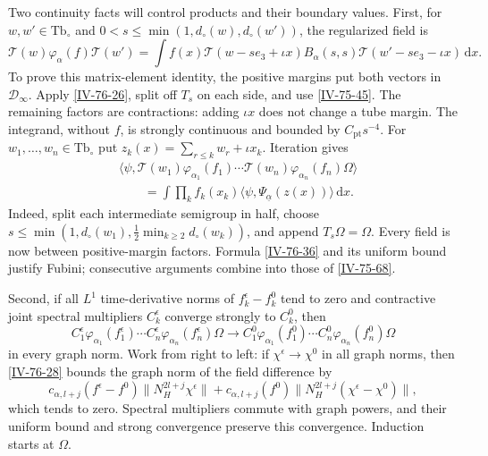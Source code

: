 \documentclass[11pt,letterpaper,reqno]{amsart}
\theoremstyle{definition}
\theoremstyle{remark}
\begin{document}
Two continuity facts will control products and their boundary
values. First, for $w,w'\in\mathrm{Tb}_\circ$ and
$0<s\le\min(1,d_\circ(w),d_\circ(w'))$, the regularized field is
\begin{equation}\label{IV-76-36}
 \mathcal T(w)\varphi_\alpha(f)\mathcal T(w')
  =\int f(x)\mathcal T(w-se_3+\iota x)B_\alpha(s,s)
                   \mathcal T(w'-se_3-\iota x)\,\mathrm{d}x.
\end{equation}
To prove this matrix-element identity, the positive margins
put both vectors in $\mathcal D_\infty$. Apply
\eqref{IV-76-26}, split off $T_s$ on each side, and use
\eqref{IV-75-45}. The remaining factors are contractions:
adding $\iota x$ does not change a tube margin. The integrand,
without $f$, is strongly continuous and bounded by
$C_{\mathrm{pt}}s^{-4}$.
For $w_1,\ldots,w_n\in\mathrm{Tb}_\circ$ put
$z_k(x)=\sum_{r\le k}w_r+\iota x_k$. Iteration gives
\begin{equation}\label{IV-76-37}
 \begin{split}
 &\langle\psi,\mathcal T(w_1)\varphi_{\alpha_1}(f_1)\cdots
                  \mathcal T(w_n)\varphi_{\alpha_n}(f_n)\Omega\rangle\\
 &\qquad=\int\prod_k f_k(x_k)
                 \langle\psi,\Psi_{\underline\alpha}(z(x))\rangle
                                                     \,\mathrm{d}x.
 \end{split}
\end{equation}
Indeed, split each intermediate semigroup in half, choose
$s\le\min(1,d_\circ(w_1),\frac12\min_{k\ge2}d_\circ(w_k))$,
and append $T_s\Omega=\Omega$. Every field is now between
positive-margin factors. Formula \eqref{IV-76-36} and its
uniform bound justify Fubini; consecutive arguments combine
into those of \eqref{IV-75-68}.

Second, if all $L^1$ time-derivative norms of
$f_k^\epsilon-f_k^0$ tend to zero and contractive joint
spectral multipliers $C_k^\epsilon$ converge strongly to
$C_k^0$, then
\begin{equation}\label{IV-76-38}
 C_1^\epsilon\varphi_{\alpha_1}(f_1^\epsilon)\cdots
 C_n^\epsilon\varphi_{\alpha_n}(f_n^\epsilon)\Omega
 \longrightarrow
 C_1^0\varphi_{\alpha_1}(f_1^0)\cdots
 C_n^0\varphi_{\alpha_n}(f_n^0)\Omega
\end{equation}
in every graph norm. Work from right to left: if
$\chi^\epsilon\to\chi^0$ in all graph norms, then
\eqref{IV-76-28} bounds the graph norm of the field difference by
\[
 c_{\alpha,l+j}(f^\epsilon-f^0)\|N_H^{2l+j}\chi^\epsilon\|
 +c_{\alpha,l+j}(f^0)\|N_H^{2l+j}(\chi^\epsilon-\chi^0)\|,
\]
which tends to zero. Spectral multipliers commute with graph
powers, and their uniform bound and strong convergence
preserve this convergence. Induction starts at $\Omega$.
\end{document}
